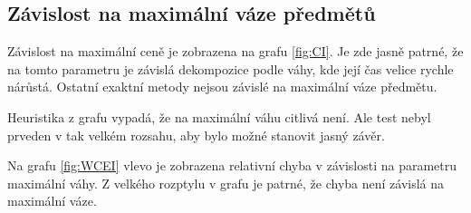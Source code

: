 \documentclass[11pt]{article}
\begin{document}
\subsection{Závislost na maximální váze předmětů}

Závislost na maximální ceně je zobrazena na grafu \ref{fig:CI}. Je zde jasně patrné, že na tomto parametru je závislá dekompozice podle váhy, kde její čas velice rychle nárůstá. Ostatní exaktní metody nejsou závislé na maximální váze předmětu. 

Heuristika z grafu vypadá, že na maximální váhu citlivá není. Ale test nebyl prveden v tak velkém rozsahu, aby bylo možné stanovit jasný závěr.

Na grafu \ref{fig:WCEI} vlevo je zobrazena relativní chyba v závislosti na parametru maximální váhy. Z velkého rozptylu v grafu je patrné, že chyba není závislá na maximální váze. 
\end{document}
